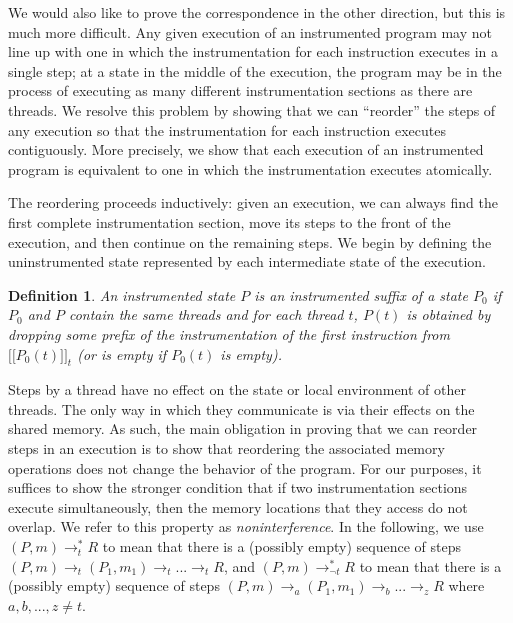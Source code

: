 \documentclass[preprint, 10pt]{sigplanconf}
\newcommand{\meanl}{\ensuremath{[ \! [}}
\newcommand{\meanr}{\ensuremath{] \! ]}}
\newcommand{\means}[1]{\ensuremath{\meanl #1 \meanr}}
\newcommand{\instr}[2]{\ensuremath{\means{#2}_{#1}}}
\newcommand{\cfg}[2]{\ensuremath{(#1, #2)}}
\newcommand{\execstart}[4]{\ensuremath{\cfg{#1}{#2} \rightarrow^{*}_{#3} #4}}
\newcommand{\execstarm}[4]{\ensuremath{\cfg{#1}{#2} \rightarrow^{*}_{\neg #3} #4}}
\newtheorem{definition}{Definition}
\begin{document}
We would also like to prove the correspondence in the other direction, but this is much more difficult. Any given execution of an instrumented program may not line up with one in which the instrumentation for each instruction executes in a single step; at a state in the middle of the execution, the program may be in the process of executing as many different instrumentation sections as there are threads. We resolve this problem by showing that we can ``reorder'' the steps of any execution so that the instrumentation for each instruction executes contiguously. More precisely, we show that each execution of an instrumented program is equivalent to one in which the instrumentation executes atomically.

The reordering proceeds inductively: given an execution, we can always find the first complete instrumentation section, move its steps to the front of the execution, and then continue on the remaining steps. We begin by defining the uninstrumented state represented by each intermediate state of the execution.
\begin{definition}An instrumented state $P$ is an \emph{instrumented suffix} of a state $P_0$ if $P_0$ and $P$ contain the same threads and for each thread $t$, $P(t)$ is obtained by dropping some prefix of the instrumentation of the first instruction from $\instr{t}{P_0(t)}$ (or is empty if $P_0(t)$ is empty).\end{definition}

Steps by a thread have no effect on the state or local environment of other threads. The only way in which they communicate is via their effects on the shared memory. As such, the main obligation in proving that we can reorder steps in an execution is to show that reordering the associated memory operations does not change the behavior of the program. For our purposes, it suffices to show the stronger condition that if two instrumentation sections execute simultaneously, then the memory locations that they access do not overlap. We refer to this property as \emph{noninterference}. In the following, we use $\execstart{P}{m}{t}{R}$ to mean that there is a (possibly empty) sequence of steps $(P, m) \rightarrow_t (P_1, m_1) \rightarrow_t ... \rightarrow_t R$, and $\execstarm{P}{m}{t}{R}$ to mean that there is a (possibly empty) sequence of steps $(P, m) \rightarrow_a (P_1, m_1) \rightarrow_b ... \rightarrow_z R$ 
where $a, b, ..., z \neq t$. 
\end{document}
